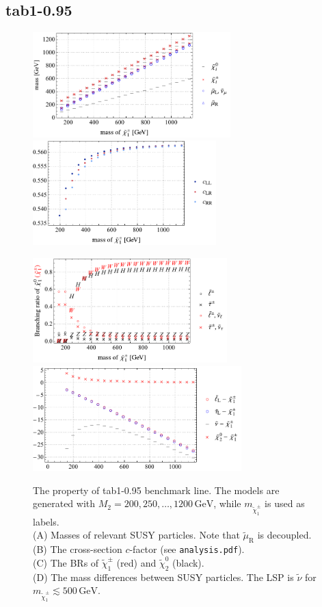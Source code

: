 \documentclass[a4paper,10pt,captions=tableheading,DIV=14]{scrartcl}
\numberwithin{equation}{section}
\newcommand\w[1]{_{\mathrm{#1}}}
\newcommand\unit[1]{\,\mathrm{#1}\xspace}
\newcommand\GeV{\unit{GeV}}
\newcommand\neut  [1][\relax]{{\tilde\chi^0_{#1}}}
\newcommand\charPM[1][\relax]{{\tilde\chi^\pm_{#1}}}
\begin{document}
\subsection{tab1-0.95}
\begin{figure}[h]
  \centering
  \includegraphics[height=115pt]{../plots/plot_tab1x095_mass.pdf}
  \includegraphics[height=115pt]{../plots/plot_tab1x095_cfactors.pdf}
\par
  \includegraphics[height=115pt]{../plots/plot_tab1x095_br21.pdf}
  \includegraphics[height=115pt]{../plots/plot_tab1x095_massdiff.pdf}
  \caption{\label{fig:tab1x005}The property of tab1-0.95 benchmark line. The models are generated with $M_2=200,250,\dots,1200\GeV$, while $m_{\charPM[1]}$ is used as labels.\\
 (A) Masses of relevant SUSY particles. Note that $\tilde\mu\w R$ is decoupled.\\
 (B) The cross-section $c$-factor (see \texttt{analysis.pdf}).\\
 (C) The BRs of $\charPM[1]$ (red) and $\neut[2]$ (black).\\
 (D) The mass differences between SUSY particles. The LSP is  $\tilde\nu$ for $m_{\charPM[1]}\lesssim 500\GeV$.
}
\end{figure}
\end{document}
